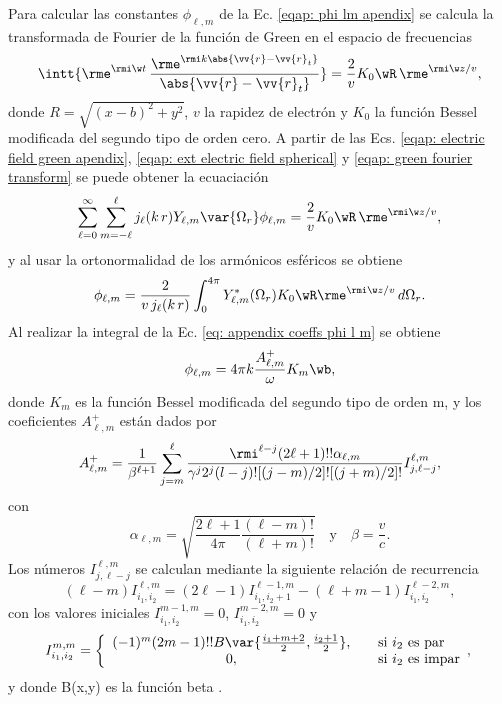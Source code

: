 Para calcular las constantes $\phi_{\ell, m}$ de la Ec. \eqref{eqap: phi lm apendix} se calcula la transformada de Fourier de la función de Green en el espacio de frecuencias \cite{maciel2019electromagnetic}
\begin{equation}
\intt{\rme^{\rmi \w t} \,\frac{\rme^{\rmi k \abs{\vv{r}-\vv{r}_t}}}{\abs{\vv{r}-\vv{r}_t}}} = \frac{2}{v} K_0\wR \, \rme^{\rmi \w z/v},
\label{eqap: green fourier transform}
\end{equation}
donde $R = \sqrt{(x-b)^2+y^2}$, $v$ la rapidez de electrón y $K_0$ la función Bessel modificada del segundo tipo de orden cero. A partir de las Ecs. \eqref{eqap: electric field green apendix}, \eqref{eqap: ext electric field spherical} y \eqref{eqap: green fourier transform} se puede obtener la ecuaciación
\begin{equation}
\sum_{\ell=0}^{\infty}\sum_{m=-\ell}^{\ell} j_{\ell}(k \, r) Y_{\ell,m}\var{\Omega_r} \phi_{\ell, m} = \frac{2}{v} K_0\wR \, \rme^{\rmi \w z/v},
\end{equation}
y al usar la ortonormalidad de los armónicos esféricos se obtiene
\begin{equation}
\phi_{\ell,m} = \frac{2}{v \,j_{\ell}(k\,r)} \int_{0}^{4\pi} Y_{\ell,m}^{*}(\Omega_r) K_0\wR \rme^{\rmi \w z /v} \, d\Omega_{r}.
\label{eq: appendix coeffs phi l m}
\end{equation}
Al realizar la integral de la Ec.  \eqref{eq: appendix coeffs phi l m} se obtiene \cite{de1999relativistic}
\begin{equation}
\phi_{\ell,m} = 4\pi k \frac{A_{\ell, m}^{+}}{\omega}K_m\wb,
\end{equation}
donde $K_m$ es la función Bessel modificada del segundo tipo de orden m, y los coeficientes $A_{\ell, m}^{+}$ están dados por
\begin{equation}
A_{\ell, m}^{+} = \frac{1}{\beta^{\ell +1}}\sum_{j=m}^{\ell}\frac{\rmi^{\ell - j} (2\ell + 1)!! \alpha_{\ell, m}}{\gamma^j 2^j (l-j)! [(j-m)/2]! [(j+m)/2]! } I_{j, \ell - j}^{\ell, m},
\end{equation}
con
\begin{equation}
\alpha_{\ell, m} = \sqrt{\frac{2\ell + 1}{4\pi}\frac{(\ell-m)!}{(\ell +m)!}} \quad \text{y} \quad \beta = \frac{v}{c}.
\end{equation}
Los números $I_{j, \ell - j}^{\ell, m}$ se calculan mediante la siguiente relación de recurrencia
\begin{equation}
(\ell - m) I_{i_1,i_2}^{\ell,m}=(2\ell-1)I_{i_1,i_2+1}^{\ell-1,m}-(\ell + m -1)I_{i_1,i_2}^{\ell-2,m},
\end{equation}
con los valores iniciales $I_{i_1,i_2}^{m-1,m}=0$, $I_{i_1,i_2}^{m-2,m}=0$ y
\begin{equation}
I_{i_1,i_2}^{m,m} = 
\left\{ 
  \begin{array}{ c l }
    (-1)^m (2m-1)!! B\var{\frac{i_1 + m +2}{2}, \frac{i_2+1}{2}}, & \quad \textrm{si } i_2 \textrm{ es par} \\
    0,                 & \quad \textrm{si } i_2 \textrm{ es impar}
  \end{array},
\right.
\end{equation}
y donde B(x,y) es la función beta \citep{Abramowitz}.


